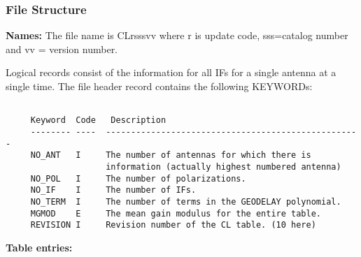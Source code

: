 \subsubsection{File Structure}
{\bf Names:} The file name is CLrsssvv where r is update code, sss=catalog
number and vv = version number.


     Logical records consist of the information for all IFs for a
single antenna at a single time.  The file header record contains the
following KEYWORDs:

\begin{verbatim}

     Keyword  Code   Description
     -------- ----  ---------------------------------------------------
     NO_ANT   I     The number of antennas for which there is
                    information (actually highest numbered antenna)
     NO_POL   I     The number of polarizations.
     NO_IF    I     The number of IFs.
     NO_TERM  I     The number of terms in the GEODELAY polynomial.
     MGMOD    E     The mean gain modulus for the entire table.
     REVISION I     Revision number of the CL table. (10 here)

\end{verbatim}
{\bf Table entries:}
